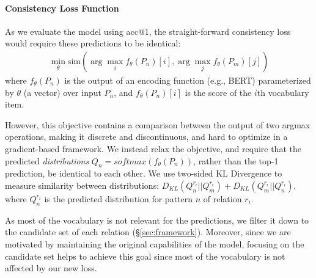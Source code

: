 \paragraph{Consistency Loss Function}
As we evaluate the model using acc@1, the straight-forward consistency loss would require these predictions to be identical:
\begin{gather*} 
\min_{\theta} \mbox{sim}(\arg\max_i f_\theta(P_n)[i], \arg\max_j f_\theta(P_m)[j])%
\end{gather*}
where $f_\theta(P_n)$ is the output of an encoding function (e.g., BERT) parameterized by $\theta$ (a vector) over input $P_n$, and $f_\theta(P_n)[i]$ is the score of the $i$th vocabulary item.

However, this objective contains a comparison between the output of two argmax operations, making it discrete and discontinuous, and hard to optimize in a gradient-based framework. We instead relax the objective, and require that the predicted \emph{distributions} $Q_n = softmax(f_\theta(P_n))$, rather than the top-1 prediction, be identical to each other. %
We use two-sided KL Divergence to measure similarity between distributions: $D_{KL}(Q_n^{r_i}||Q_m^{r_i}) + D_{KL}(Q_m^{r_i}||Q_n^{r_i})$.
where $Q_n^{r_i}$ is the predicted distribution for pattern $n$ of relation $r_i$.


As most of the vocabulary is not relevant for the
predictions, we filter it down to the candidate set of each relation (\S\ref{sec:framework}). Moreover, since we are motivated by maintaining the original capabilities of the model, focusing on the candidate set helps to achieve this goal since most of the vocabulary is not affected by our new loss.

